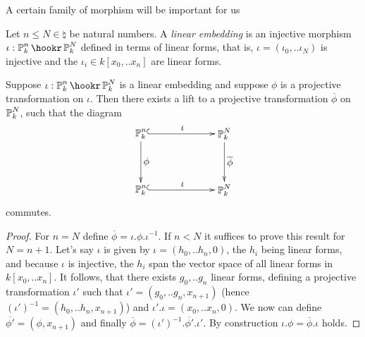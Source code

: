 A certain family of morphism will be important for us
\begin{definition}
Let $n \leq N \in \natural$ be natural numbers.
A \emph{linear embedding} is an injective morphism $\iota : \proj^n_k \hookr \proj^N_k$ defined in terms of linear forms, that is, $\iota = (\iota_0,..\iota_N)$ is injective and the $\iota_i \in k[x_0,..x_n]$ are linear forms.
\end{definition}

\begin{proposition} \label{propositionLiftingAutomorphisms}
Suppose $\iota : \proj^n_k \hookr \proj^N_k$ is a linear embedding and suppose $\phi$ is a projective transformation on $\iota$.
Then there exists a lift to a projective transformation $\overline\phi$ on $\operatorname{\mathbb P}^N_k$, such that the diagram
\begin{equation}
\begin{xy}
(0,20)*+{\proj^n_k}="n";
(30,20)*+{\proj^N_k}="N";
(0,0)*+{\proj^n_k}="n1";
(30,0)*+{\proj^N_k}="N1";
{\ar@{^{(}->} "n";"N"}?*!/_2mm/{\iota};
{\ar@{^{(}->} "n1";"N1"}?*!/_2mm/{\iota};
{\ar@{->} "n";"n1"}?*!/_2mm/{\phi};
{\ar@{->} "N";"N1"}?*!/_2mm/{\overline{\phi}};
\end{xy}
\end{equation}
commutes.
\end{proposition}
\begin{proof}
For $n=N$ define $\overline\phi = \iota.\phi.\iota^{-1}$.
If $n < N$ it suffices to prove this result for $N = n+1$.
Let's say $\iota$ is given by $\iota = (h_0,..h_n,0)$, the $h_i$ being linear forms, and because $\iota$ is injective, the $h_i$ span the vector space of all linear forms in $k[x_0,..x_n]$.
It follows, that there exists $g_0,..g_n$ linear forms, defining a projective transformation $\iota'$ such that $\iota' = (g_0,..g_n,x_{n+1})$ (hence $(\iota')^{-1} = (h_0,..h_n,x_{n+1})$) and $\iota'.\iota = (x_0,..x_n,0)$.
We now can define $\overline{\phi'} = (\phi,x_{n+1})$ and finally $\overline\phi = (\iota')^{-1}.\overline{\phi'}.\iota'$.
By construction $\iota.\phi = \overline\phi . \iota$ holds.
\end{proof}


